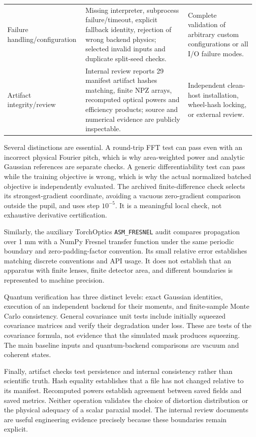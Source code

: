 \documentclass[journal]{IEEEtran}
\begin{document}
\begin{table}[!t]
\begin{tabular}{p{}p{}p{}}
Failure handling/configuration & Missing interpreter, subprocess failure/timeout, explicit fallback identity, rejection of wrong backend physics; selected invalid inputs and duplicate split-seed checks. & Complete validation of arbitrary custom configurations or all I/O failure modes.\\
Artifact integrity/review & Internal review reports 29 manifest artifact hashes matching, finite NPZ arrays, recomputed optical powers and efficiency products; source and numerical evidence are publicly inspectable. & Independent clean-host installation, wheel-hash locking, or external review.\\
\bottomrule
\end{tabular}
\end{table}

Several distinctions are essential. A round-trip FFT test can pass even with an incorrect physical Fourier pitch, which is why area-weighted power and analytic Gaussian references are separate checks. A generic differentiability test can pass while the training objective is wrong, which is why the actual normalized batched objective is independently evaluated. The archived finite-difference check selects its strongest-gradient coordinate, avoiding a vacuous zero-gradient comparison outside the pupil, and uses step $10^{-5}$. It is a meaningful local check, not exhaustive derivative certification.

Similarly, the auxiliary TorchOptics \texttt{ASM\_FRESNEL} audit compares propagation over 1 mm with a NumPy Fresnel transfer function under the same periodic boundary and zero-padding-factor convention. Its small relative error establishes matching discrete conventions and API usage. It does not establish that an apparatus with finite lenses, finite detector area, and different boundaries is represented to machine precision.

Quantum verification has three distinct levels: exact Gaussian identities, execution of an independent backend for their moments, and finite-sample Monte Carlo consistency. General covariance unit tests include initially squeezed covariance matrices and verify their degradation under loss. These are tests of the covariance formula, not evidence that the simulated mask produces squeezing. The main baseline inputs and quantum-backend comparisons are vacuum and coherent states.

Finally, artifact checks test persistence and internal consistency rather than scientific truth. Hash equality establishes that a file has not changed relative to its manifest. Recomputed powers establish agreement between saved fields and saved metrics. Neither operation validates the choice of distortion distribution or the physical adequacy of a scalar paraxial model. The internal review documents are useful engineering evidence precisely because these boundaries remain explicit.
\end{document}

